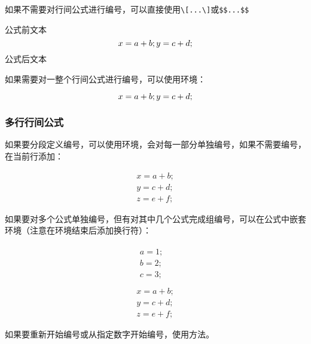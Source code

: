     如果不需要对行间公式进行编号，可以直接使用\verb|\[...\]|或\verb|$$...$$|
    \begin{texshow}
        公式前文本
        \[
            x = a+b;\\
            y = c+d;
        \]
        公式后文本
    \end{texshow}

    如果需要对一整个行间公式进行编号，可以使用环境：
    \begin{texshow}
        \begin{equation}
            x = a+b;\\
            y = c+d;
        \end{equation}
    \end{texshow}

    \subsubsection{多行行间公式}
    如果要分段定义编号，可以使用环境，会对每一部分单独编号，如果不需要编号，在当前行添加：
    \begin{texshow}
        \begin{eqnarray}
            x = a+b;\\
            y = c+d;\nonumber\\
            z = e+f;
        \end{eqnarray}
    \end{texshow}
    如果要对多个公式单独编号，但有对其中几个公式完成组编号，可以在公式中嵌套环境（注意在环境结束后添加换行符）：
    \begin{texshow}
        \begin{eqnarray}
            \begin{split}
                a = 1;\\
                b = 2;\\
                c = 3;\\
            \end{split}\\
            x = a+b;\\
            y = c+d;\nonumber\\
            z = e+f;
        \end{eqnarray}
    \end{texshow}
    如果要重新开始编号或从指定数字开始编号，使用方法。

